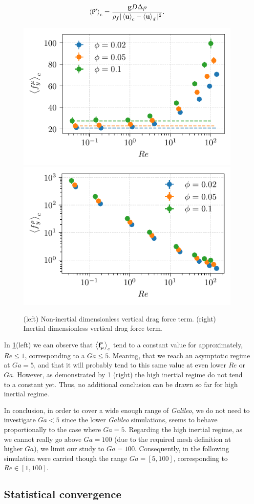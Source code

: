 \begin{equation*}
    \left<\textbf{f}^\rho\right>_c = \frac{\textbf{g} D\Delta \rho}{\rho_f |\left<\textbf{u}\right>_c - \left<\textbf{u}\right>_d|^2}. 
\end{equation*} 
\begin{figure}[h!]
    \centering
    \includegraphics[height= 0.3\textwidth]{image/Dim_3/fCA/FH_Re_mu.pdf}
    \includegraphics[height= 0.3\textwidth]{image/Dim_3/fCA/FH_rho_Re.pdf}
    \caption{(left) Non-inertial dimensionless vertical drag force term. 
             (right) Inertial dimensionless vertical drag force term. }
    \label{fig:f_u_f_rho}
\end{figure}
In \ref{fig:f_u_f_rho}(left) we can observe that $\left<\textbf{f}_\mu^*\right>_c$ tend to a constant value for approximately, $Re \le 1$, corresponding to a $Ga \le 5$.
Meaning, that we reach an asymptotic regime at $Ga=5$, and that it will probably tend to this same value at even lower $Re$ or $Ga$. 
However, as demonstrated by \ref{fig:f_u_f_rho} (right) the high inertial regime do not tend to a constant yet. 
Thus, no additional conclusion can be drawn so far for high inertial regime. 

In conclusion, in order to cover a wide enough range of \textit{Galileo}, we do not need to investigate $Ga<5$ since the lower \textit{Galileo} simulations, seems to behave proportionally to the case where $Ga = 5$. 
Regarding the high inertial regime, as we cannot really go above $Ga =100$ (due to the required mesh definition at higher $Ga$), we limit our study to $Ga =100$.  
Consequently, in the following simulation were carried though the range $Ga = [5,100]$, corresponding to $Re \in [1,100]$. 

\subsection{Statistical convergence}

